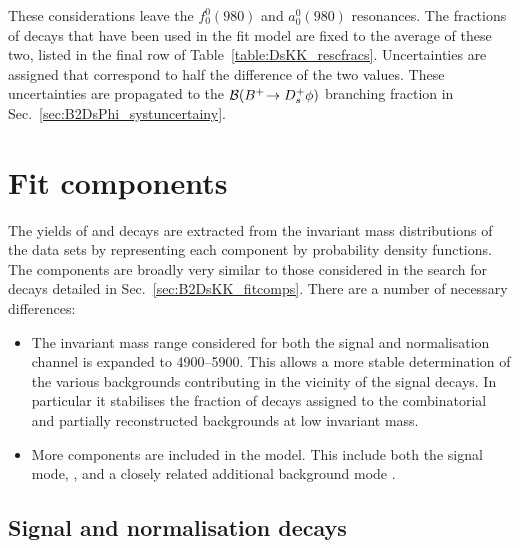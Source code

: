 These considerations leave the $f_{0}^{0}(980)$ and $a_{0}^{0}(980)$ resonances. The fractions of \decay{\Bp}{\Dsp\Kp\Km} decays that have been used in the fit model are fixed to the average of these two, listed in the final row of Table~\ref{table:DsKK_rescfracs}. Uncertainties are assigned that correspond to half the difference of the two values. These uncertainties are propagated to the ${\mathcal{B}}({{{B}^+}}\!\rightarrow {\ensuremath{{D}^+_{s}}}\phi)$ branching fraction in Sec.~\ref{sec:B2DsPhi_systuncertainy}. 



\section{Fit components}
\label{sec:B2DsPhi_fitcomponents}

The yields of \decay{\Bp}{\Dsp\phiz} and \decay{\Bp}{\Dsp\Dzb} decays are extracted from the invariant mass distributions of the data sets by representing each component by probability density functions. The components are broadly very similar to those considered in the search for \decay{\Bp}{\Dsp\Kp\Km} decays detailed in Sec.~\ref{sec:B2DsKK_fitcomps}. There are a number of necessary differences:
\begin{itemize}
\item The \Bp invariant mass range considered for both the signal and normalisation channel is expanded to 4900--5900\mevcc. This allows a more stable determination of the various backgrounds contributing in the vicinity of the signal decays. In particular it stabilises the fraction of decays assigned to the combinatorial and partially reconstructed backgrounds at low \Bp invariant mass.   
\item More components are included in the model. This include both the signal mode, \decay{\Bp}{\Dsp\phiz}, and a closely related additional background mode \decay{\Bp}{\Dssp\phiz}. 
\end{itemize}


\subsection{Signal and normalisation decays}
\label{sec:B2DsPhi_signalcomps}


